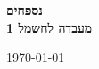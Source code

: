 \begin{titlepage}
	\begin{hebrew}
		\begin{center}
			\scshape\Huge\textbf{נספחים} \\
			\vspace{0.5cm}
			\scshape\huge\textbf{מעבדה לחשמל 1} \\
			\vspace{10cm}
			\large
			\vfill
			
			\vfill
			
			\large \today\par
		\end{center}
	\end{hebrew}
\end{titlepage}